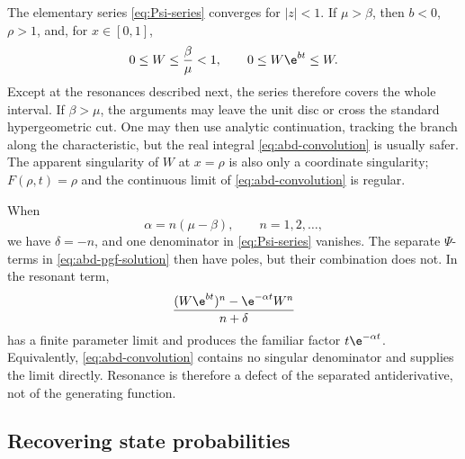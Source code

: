 The elementary series \cref{eq:Psi-series} converges for \(|z|<1\).  If
\(\mu>\beta\), then \(b<0\), \(\rho>1\), and, for \(x\in[0,1]\),
\begin{equation}
  0\leq W\leq\frac{\beta}{\mu}<1,
  \qquad
  0\leq W\e^{bt}\leq W.
\end{equation}
Except at the resonances described next, the series therefore covers the whole
\pgf{} interval.  If \(\beta>\mu\), the arguments may leave the unit disc or cross
the standard hypergeometric cut.  One may then use analytic continuation, tracking
the branch along the characteristic, but the real integral
\cref{eq:abd-convolution} is usually safer.  The apparent singularity of \(W\) at
\(x=\rho\) is also only a coordinate singularity; \(F(\rho,t)=\rho\) and the
continuous limit of \cref{eq:abd-convolution} is regular.

When
\begin{equation}
  \alpha=n(\mu-\beta),
  \qquad n=1,2,\ldots,
  \label{eq:abd-resonance}
\end{equation}
we have \(\delta=-n\), and one denominator in
\cref{eq:Psi-series} vanishes.  The separate \(\Psi\)-terms in
\cref{eq:abd-pgf-solution} then have poles, but their combination does not.  In the
resonant term,
\begin{equation}
  \frac{(W\e^{bt})^n-\e^{-\alpha t}W^n}{n+\delta}
  \label{eq:resonant-cancellation}
\end{equation}
has a finite parameter limit and produces the familiar factor
\(t\e^{-\alpha t}\).  Equivalently, \cref{eq:abd-convolution} contains no singular
denominator and supplies the limit directly.  Resonance is therefore a defect of
the separated antiderivative, not of the generating function.

\subsection{Recovering state probabilities}
\label{sec:coefficient-recovery}


